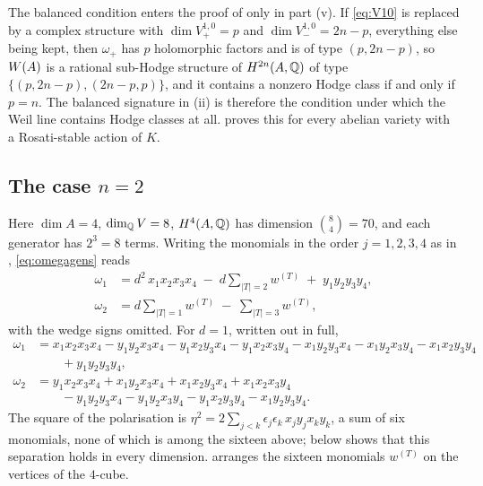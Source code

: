 \begin{remark}\label{rem:balancecount}
The balanced condition enters the proof of  only in
part (v). If \eqref{eq:V10} is replaced by a complex structure with
$\dim V^{1,0}_{+}=p$ and $\dim V^{1,0}_{-}=2n-p$, everything else being kept,
then $\omega_{+}$ has $p$ holomorphic factors and is of type $(p,2n-p)$, so
$W(A)$ is a rational sub-Hodge structure of $H^{2n}(A,\mathbb{Q})$ of type
$\{(p,2n-p),(2n-p,p)\}$, and it contains a nonzero Hodge class if and only if
$p=n$. The balanced signature
in (ii) is therefore the condition under which the Weil
line contains Hodge classes at all.  proves this
for every abelian variety with a Rosati-stable action of $K$.
\end{remark}

\subsection{The case \texorpdfstring{$n=2$}{n=2}}

Here $\dim A=4$, $\dim_{\mathbb{Q}}V=8$, $H^{4}(A,\mathbb{Q})$ has dimension
$\binom{8}{4}=70$, and each generator has $2^{3}=8$ terms. Writing the
monomials in the order $j=1,2,3,4$ as in , \eqref{eq:omegagens}
reads
\begin{align}
  \omega_{1}
  &= d^{2}\,x_{1}x_{2}x_{3}x_{4}
     \;-\;d\!\!\sum_{|T|=2}\!\!w^{(T)}
     \;+\;y_{1}y_{2}y_{3}y_{4},
     \label{eq:n2omega1}\\[2pt]
  \omega_{2}
  &= d\!\!\sum_{|T|=1}\!\!w^{(T)}
     \;-\;\sum_{|T|=3}\!\!w^{(T)} ,
     \label{eq:n2omega2}
\end{align}
with the wedge signs omitted. For $d=1$, written out in full,
\begin{align*}
  \omega_{1}
  &= x_{1}x_{2}x_{3}x_{4}
   -y_{1}y_{2}x_{3}x_{4}-y_{1}x_{2}y_{3}x_{4}-y_{1}x_{2}x_{3}y_{4}
   -x_{1}y_{2}y_{3}x_{4}-x_{1}y_{2}x_{3}y_{4}-x_{1}x_{2}y_{3}y_{4}\\
  &\qquad{}+y_{1}y_{2}y_{3}y_{4},\\
  \omega_{2}
  &= y_{1}x_{2}x_{3}x_{4}+x_{1}y_{2}x_{3}x_{4}+x_{1}x_{2}y_{3}x_{4}
     +x_{1}x_{2}x_{3}y_{4}\\
  &\qquad{}-y_{1}y_{2}y_{3}x_{4}-y_{1}y_{2}x_{3}y_{4}-y_{1}x_{2}y_{3}y_{4}
     -x_{1}y_{2}y_{3}y_{4} .
\end{align*}
The square of the polarisation is
$\eta^{2}=2\sum_{j<k}\epsilon_{j}\epsilon_{k}\,x_{j}y_{j}x_{k}y_{k}$,
a sum of six monomials, none of which is among the sixteen above;
 below shows that this separation holds in every
dimension.  arranges the sixteen monomials $w^{(T)}$ on
the vertices of the $4$-cube.

